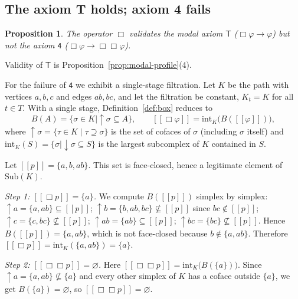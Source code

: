 \documentclass[final,12pt]{elsarticle}
\newcommand{\llbracket}{[\![}
\newcommand{\rrbracket}{]\!]}
\theoremstyle{plain}
\newtheorem{prop}[thm]{Proposition}
\theoremstyle{definition}
\begin{document}
\subsection{The axiom T holds; axiom 4 fails}

\begin{prop}
\label{prop:box-not-4}
The operator \(\Box\) validates the modal axiom \(\mathsf{T}\)
(\(\Box\varphi\to\varphi\)) but \emph{not} the axiom \(\mathsf{4}\)
(\(\Box\varphi\to\Box\Box\varphi\)).
\end{prop}

\proof
Validity of \(\mathsf{T}\) is Proposition~\ref{prop:modal-profile}(4).

For the failure of \(\mathsf{4}\) we exhibit a single-stage filtration.  Let
\(K\) be the path with vertices \(a,b,c\) and edges \(ab,bc\), and let the
filtration be constant, \(K_t = K\) for all \(t\in T\).  With a single stage,
Definition~\ref{def:box} reduces to
\[   B(A) = \{\sigma \in K \mid \uparrow\!\sigma \subseteq A\},   \qquad   \llbracket \Box\varphi \rrbracket   = \mathrm{int}_K\bigl(B(\llbracket\varphi\rrbracket)\bigr), \]
where \(\uparrow\!\sigma = \{\tau \in K \mid \tau \supseteq \sigma\}\) is the
set of cofaces of \(\sigma\) (including \(\sigma\) itself) and
\(\mathrm{int}_K(S) = \{\sigma \mid \downarrow\!\sigma \subseteq S\}\) is the
largest subcomplex of \(K\) contained in \(S\).

Let \(\llbracket p \rrbracket = \{a, b, ab\}\).  This set is face-closed,
hence a legitimate element of \(\mathrm{Sub}(K)\).

\emph{Step 1: \(\llbracket \Box p \rrbracket = \{a\}\).}
We compute \(B(\llbracket p\rrbracket)\) simplex by simplex:
\(\uparrow\! a = \{a, ab\} \subseteq \llbracket p\rrbracket\);
\(\uparrow\! b = \{b, ab, bc\} \not\subseteq \llbracket p\rrbracket\) since
\(bc \notin \llbracket p\rrbracket\);
\(\uparrow\! c = \{c, bc\} \not\subseteq \llbracket p\rrbracket\);
\(\uparrow\! ab = \{ab\} \subseteq \llbracket p\rrbracket\);
\(\uparrow\! bc = \{bc\} \not\subseteq \llbracket p\rrbracket\).
Hence \(B(\llbracket p\rrbracket) = \{a, ab\}\), which is not face-closed
because \(b \notin \{a,ab\}\).  Therefore
\(\llbracket \Box p \rrbracket = \mathrm{int}_K(\{a,ab\}) = \{a\}\).

\emph{Step 2: \(\llbracket \Box\Box p \rrbracket = \varnothing\).}
Here \(\llbracket \Box\Box p \rrbracket = \mathrm{int}_K\bigl(B(\{a\})\bigr)\).
Since \(\uparrow\! a = \{a, ab\} \not\subseteq \{a\}\) and every other simplex
of \(K\) has a coface outside \(\{a\}\), we get \(B(\{a\}) = \varnothing\),
so \(\llbracket \Box\Box p \rrbracket = \varnothing\).
\end{document}
